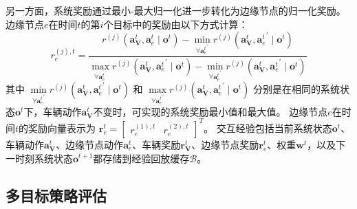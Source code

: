另一方面，系统奖励通过最小-最大归一化进一步转化为边缘节点的归一化奖励。
边缘节点$e$在时间$t$的第$i$个目标中的奖励由以下方式计算：
\begin{equation}
	r_{e}^{(j), t}= \frac{r^{(j)}\left(\boldsymbol{a}_{\mathbf{V}}^{t},\boldsymbol{a}_{e}^{t} \mid \boldsymbol{o}^{t}\right) - \min \limits_{\forall {\boldsymbol{a}_{e}^{t}}^{\prime}} r^{(j)}\left(\boldsymbol{a}_{\mathbf{V}}^{t}, {\boldsymbol{a}_{e}^{t}}^{\prime} \mid \boldsymbol{o}^{t}\right)} {\max \limits_{\forall {\boldsymbol{a}_{e}^{t}}^{\prime}} r^{(j)}\left(\boldsymbol{a}_{\mathbf{V}}^{t}, {\boldsymbol{a}_{e}^{t}}^{\prime} \mid \boldsymbol{o}^{t}\right) - \min \limits_{\forall {\boldsymbol{a}_{e}^{t}}^{\prime}} r^{(j)}\left(\boldsymbol{a}_{\mathbf{V}}^{t}, {\boldsymbol{a}_{e}^{t}}^{\prime} \mid \boldsymbol{o}^{t}\right)}
\label{equ 4-41}
\end{equation}
\noindent 其中 $\min \limits_{\forall {\boldsymbol{a}_{e}^{t}}^{\prime}} r^{(j)} (\boldsymbol{a}_{\mathbf{V}}^{t}, {\boldsymbol{a}_{e}^{t}}^{\prime} \mid \boldsymbol{o}^{t})$ 和 $\max \limits_{\forall {\boldsymbol{a}_{e}^{t}}^{\prime}} r^{(j)}(\boldsymbol{a}_{\mathbf{V}}^{t}, {\boldsymbol{a}_{e}^{t}}^{\prime} \mid \boldsymbol{o}^{t})$ 分别是在相同的系统状态$\boldsymbol{o}^{t}$下，车辆动作$\boldsymbol{a}_{\mathbf{V}}^{t}$不变时，可实现的系统奖励最小值和最大值。
边缘节点$e$在时间$t$的奖励向量表示为 $\boldsymbol{r}_{e}^{t} = \begin{bmatrix}  r_{e}^{(1), t}  &  r_{e}^{(2), t} \end{bmatrix} ^{T}$。
交互经验包括当前系统状态$\boldsymbol{o}^{t}$、车辆动作$\boldsymbol{a}_{\mathbf{V}}^{t}$、边缘节点动作$\boldsymbol{a}_{e}^{t}$、车辆奖励$\boldsymbol{r}_{\mathbf{V}}^{t}$、边缘节点奖励$\boldsymbol{r}_{e}^{t}$、权重$\boldsymbol{w}^{t}$，以及下一时刻系统状态$\boldsymbol{o}^{t+1}$都存储到经验回放缓存$\mathcal{B}$。

\subsection[\hspace{-2pt}多目标策略评估]{{ \hspace{-8pt}多目标策略评估}}

